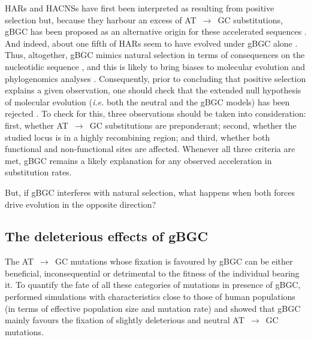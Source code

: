 HARs and HACNSs have first been interpreted as resulting from positive selection \citep[reviewed in][]{hubisz2014exploring} but, because they harbour an excess of AT~$\rightarrow$~GC substitutions, gBGC has been proposed as an alternative origin for these accelerated sequences \citep{galtier2007adaptation,berglund2009hotspots,duret2009comment,katzman2010gcbiased,ratnakumar2010detecting}.
And indeed, about one fifth of HARs seem to have evolved under gBGC alone \citep{kostka2012role}.\\


Thus, altogether, gBGC mimics natural selection in terms of consequences on the nucleotidic sequence \citep{bherer2014biased}, and this is likely to bring biases to molecular evolution and phylogenomics analyses \citep{berglund2009hotspots,ratnakumar2010detecting,webster2012direct,romiguier2013less,romiguier2016phylogenomics,romiguier2017analytical,bolivar2018biased,bolivar2019gcbiased,rousselle2019influence}.
Consequently, prior to concluding that positive selection explains a given observation, one should check that the extended null hypothesis of molecular evolution (\textit{i.e.} both the neutral and the gBGC models) has been rejected \citep{galtier2007adaptation, duret2009biased}.
To check for this, three observations should be taken into consideration: first, whether AT~$\rightarrow$~GC substitutions are preponderant; second, whether the studied locus is in a highly recombining region; and third, whether both functional and non-functional sites are affected.
Whenever all three criteria are met, gBGC remains a likely explanation for any observed acceleration in substitution rates.

But, if gBGC interferes with natural selection, what happens when both forces drive evolution in the opposite direction? 




\subsection{The deleterious effects of gBGC}

The AT~$\rightarrow$~GC mutations whose fixation is favoured by gBGC can be either beneficial, inconsequential or detrimental to the fitness of the individual bearing it.
To quantify the fate of all these categories of mutations in presence of gBGC, \citet{duret2009biased} performed simulations with characteristics close to those of human populations (in terms of effective population size and mutation rate) and showed that gBGC mainly favours the fixation of slightly deleterious and neutral AT~$\rightarrow$~GC mutations.

